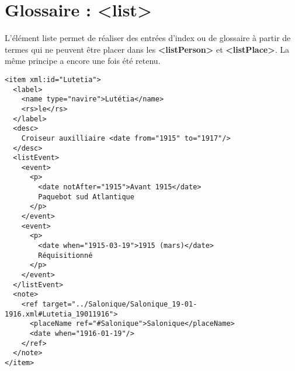 \documentclass[18pt,a4paper,oneside]{book} %
\begin{document}
\section{Glossaire : <list>}

L'élément liste permet de réaliser des entrées d'index ou de glossaire à partir de termes qui ne peuvent être placer dans les \textbf{<listPerson>} et \textbf{<listPlace>}.
La même principe a encore une fois été retenu.

\begin{lstlisting}
<item xml:id="Lutetia">
  <label>
    <name type="navire">Lutétia</name>
    <rs>le</rs>                     
  </label>      
  <desc>
    Croiseur auxilliaire <date from="1915" to="1917"/>
  </desc>
  <listEvent>
    <event>
      <p>
        <date notAfter="1915">Avant 1915</date> 
        Paquebot sud Atlantique
      </p>
    </event>
    <event>
      <p>
        <date when="1915-03-19">1915 (mars)</date> 
        Réquisitionné
      </p>
    </event>
  </listEvent>
  <note>
    <ref target="../Salonique/Salonique_19-01-1916.xml#Lutetia_19011916">
      <placeName ref="#Salonique">Salonique</placeName>
      <date when="1916-01-19"/>
    </ref>
  </note>
</item>
\end{lstlisting} 
\end{document}
